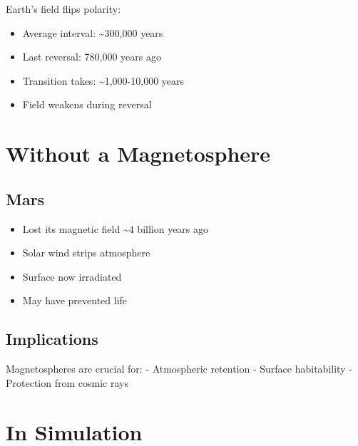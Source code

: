 \documentclass[
  11pt,
  letterpaper,
  twoside,
  openright]{book}
\providecommand{\tightlist}{%
  \setlength{\itemsep}{0pt}\setlength{\parskip}{0pt}}
\begin{document}
Earth's field flips polarity:

\begin{itemize}
\tightlist
\item
  Average interval: \textasciitilde300,000 years
\item
  Last reversal: 780,000 years ago
\item
  Transition takes: \textasciitilde1,000-10,000 years
\item
  Field weakens during reversal
\end{itemize}

\section{Without a Magnetosphere}\label{without-a-magnetosphere}

\subsection{Mars}\label{mars-2}

\begin{itemize}
\tightlist
\item
  Lost its magnetic field \textasciitilde4 billion years ago
\item
  Solar wind strips atmosphere
\item
  Surface now irradiated
\item
  May have prevented life
\end{itemize}

\subsection{Implications}\label{implications}

Magnetospheres are crucial for: - Atmospheric retention - Surface
habitability - Protection from cosmic rays

\section{In Simulation}\label{in-simulation-10}
\end{document}
